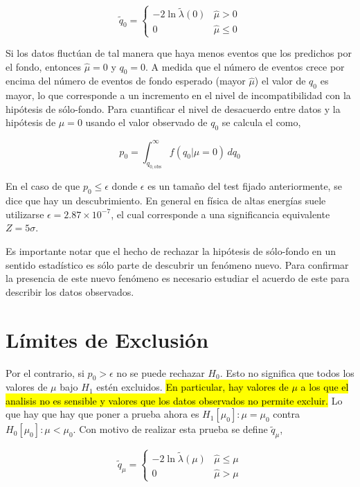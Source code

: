 \begin{equation}
  \tilde{q}_0 =
  \begin{cases}
    -2 \ln \tilde{\lambda}(0) & \hat{\mu} > 0 \\
    0 & \hat{\mu} \leq 0
  \end{cases}
\end{equation}

Si los datos fluctúan de tal manera que haya menos eventos que los predichos por
el fondo, entonces $\hat{\mu} = 0$ y $q_0=0$. A medida que el número de
eventos crece por encima del número de eventos de fondo esperado (mayor
$\hat{\mu}$) el valor de $q_0$ es mayor, lo que corresponde a un incremento en
el nivel de incompatibilidad con la hipótesis de sólo-fondo. Para cuantificar el
nivel de desacuerdo entre datos y la hipótesis de $\mu=0$ usando el valor
observado de $q_0$ se calcula el {\pvalue} como,

\begin{equation}
  p_0 = \int_{q_{0,\text{obs}}}^{\infty} f(q_0|\mu=0) \, dq_0
  \label{eq:p0}
\end{equation}

En el caso de que $p_0 \leq \epsilon$ donde $\epsilon$ es un tamaño del test
fijado anteriormente, se dice que hay un descubrimiento. En general en física de
altas energías suele utilizarse $\epsilon = 2.87 \times 10^{-7}$, el cual
corresponde a una significancia equivalente $Z=5\sigma$.

Es importante notar que el hecho de rechazar la hipótesis de sólo-fondo en un
sentido estadístico es sólo parte de descubrir un fenómeno nuevo.
Para confirmar la presencia de este nuevo fenómeno es necesario estudiar
el acuerdo de este para describir los datos observados.


\section{Límites de Exclusión}

Por el contrario, si $p_0> \epsilon$ no se puede rechazar $H_0$. Esto no
significa que todos los valores de $\mu$ bajo $H_1$ estén excluidos.
\hl{En particular, hay valores de $\mu$ a los que el analisis no es sensible
y valores que los datos observados no permite excluir.}
Lo que hay
que hay que poner a prueba ahora es $H_1[\mu_0]: \mu = \mu_0$ contra $H_0[\mu_0]: \mu < \mu_0$.
Con motivo de realizar esta prueba se define $\tilde{q}_\mu$,

\begin{equation}
  \tilde{q}_\mu =
  \begin{cases}
    -2 \ln \tilde{\lambda}(\mu) & \hat{\mu} \leq \mu \\
    0 & \hat{\mu} > \mu
  \end{cases} \label{eq:qmu}
\end{equation}

